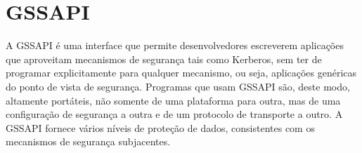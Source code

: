 



\section{GSSAPI}

A GSSAPI é uma interface que permite desenvolvedores escreverem aplicações que aproveitam mecanismos de segurança tais como Kerberos, sem ter de programar explicitamente para qualquer mecanismo, ou seja, aplicações genéricas do ponto de vista de segurança. Programas que usam GSSAPI são, deste modo, altamente portáteis, não somente de uma plataforma para outra, mas de uma configuração de segurança a outra e de um protocolo de transporte a outro. A GSSAPI fornece vários níveis de proteção de dados, consistentes com os mecanismos de segurança subjacentes.\cite{HUGO}



% 
% 
% 
% 
% 
% 
% 
% 
% 
% 
% 
% 
% 
% 


